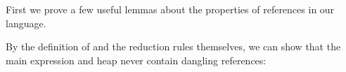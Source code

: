 
	First we prove a few useful lemmas about the properties of references in our language.

	\LS
	
	By the definition of \VS and the reduction rules themselves, we can show that the main expression and heap never contain dangling references:
	
